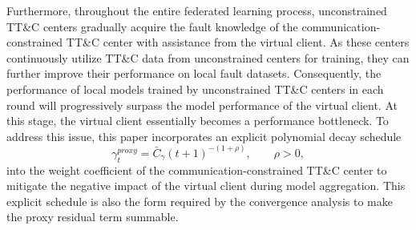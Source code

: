 Furthermore, throughout the entire federated learning process, 
unconstrained TT\&C centers gradually acquire 
the fault knowledge of the communication-constrained TT\&C center with assistance from the virtual client. 
As these centers continuously utilize TT\&C data from unconstrained centers for training, 
they can further improve their performance on local fault datasets. 
Consequently, the performance of local models trained by unconstrained TT\&C centers 
in each round will progressively surpass the model performance of the virtual client. 
At this stage, the virtual client essentially becomes a performance bottleneck. 
To address this issue, this paper incorporates an explicit polynomial decay schedule
\begin{equation}
	\gamma _t^{proxy}=\bar C_{\gamma}(t+1)^{-(1+\rho )}, \qquad \rho > 0,
\end{equation}
into the weight coefficient of the communication-constrained TT\&C center 
to mitigate the negative impact of the virtual client during model aggregation. This explicit schedule is also the form required by the convergence analysis to make the proxy residual term summable.